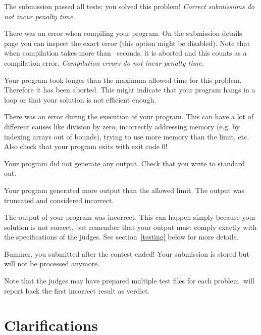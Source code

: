 \begin{description}[\setleftmargin{4.5cm}]
\item[CORRECT]
The submission passed all tests: you solved this problem!
\textit{Correct submissions do not incur penalty time.}

\item[COMPILER-ERROR]
There was an error when compiling your program. On the submission
details page you can inspect the exact error (this option might be
disabled).
Note that when compilation takes more than \COMPILETIME\ seconds, it is aborted and
this counts as a compilation error.
\textit{Compilation errors do not incur penalty time.}

\item[TIMELIMIT]
Your program took longer than the maximum allowed time for this
problem. Therefore it has been aborted. This might indicate that your
program hangs in a loop or that your solution is not efficient
enough.

\item[RUN-ERROR]
There was an error during the execution of your program. This can have
a lot of different causes like division by zero, incorrectly
addressing memory (e.g. by indexing arrays out of bounds), trying to
use more memory than the limit, etc.
Also check that your program exits with exit code 0!

\item[NO-OUTPUT]
Your program did not generate any output. Check that you write to
standard out.

\item[OUTPUT-LIMIT]
Your program generated more output than the allowed limit. The output
was truncated and considered incorrect.

\item[WRONG-ANSWER]
The output of your program was incorrect. This can happen simply
because your solution is not correct, but remember that your output
must comply exactly with the specifications of the judges. See
section~\ref{testing} below for more details.

\item[TOO-LATE]
Bummer, you submitted after the contest ended! Your submission is
stored but will not be processed anymore.
\end{description}

Note that the judges may have prepared multiple test files for each
problem. \DOMjudge will report back the first incorrect result as verdict.

\section{Clarifications}

